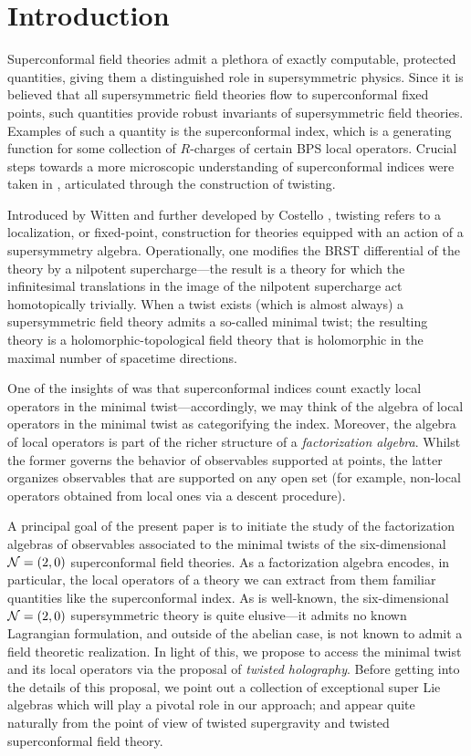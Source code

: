 \documentclass[11pt]{amsart}
\begin{document}
\section{Introduction}
Superconformal field theories admit a plethora of exactly computable, protected quantities, giving them a distinguished role in supersymmetric physics. 
Since it is believed that all supersymmetric field theories flow to superconformal fixed points, such quantities provide robust invariants of supersymmetric field theories. 
Examples of such a quantity is the superconformal index, which is a generating function for some collection of $R$-charges of certain BPS local operators. 
Crucial steps towards a more microscopic understanding of superconformal indices were taken in  \cite{}, articulated through the construction of twisting.

Introduced by Witten \cite{WittenTwist} and further developed by Costello \cite{CostelloHol}, twisting refers to a localization, or fixed-point, construction for theories equipped with an action of a supersymmetry algebra. 
Operationally, one modifies the BRST differential of the theory by a nilpotent supercharge---the result is a theory for which the infinitesimal translations in the image of the nilpotent supercharge act homotopically trivially. 
When a twist exists (which is almost always) a supersymmetric field theory admits a so-called minimal twist; the resulting theory is a holomorphic-topological field theory that is holomorphic in the maximal number of spacetime directions.

One of the insights of  \cite{} was that superconformal indices count exactly local operators in the minimal twist---accordingly, we may think of the algebra of local operators in the minimal twist as categorifying the index. 
Moreover, the algebra of local operators is part of the richer structure of a \textit{factorization algebra}. 
Whilst the former governs the behavior of observables supported at points, the latter organizes observables that are supported on any open set (for example, non-local operators obtained from local ones via a descent procedure). 

A principal goal of the present paper is to initiate the study of the factorization algebras of observables associated to the minimal twists of the six-dimensional~$\mathcal N=(2,0)$ superconformal field theories.
As a factorization algebra encodes, in particular, the local operators of a theory we can extract from them familiar quantities like the superconformal index.
As is well-known, the six-dimensional~$\mathcal N=(2,0)$ supersymmetric theory is quite elusive---it admits no known Lagrangian formulation, and outside of the abelian case, is not known to admit a field theoretic realization. 
In light of this, we propose to access the minimal twist and its local operators via the proposal of \textit{twisted holography}.
Before getting into the details of this proposal, we point out a collection of exceptional super Lie algebras which will play a pivotal role in our approach; and appear quite naturally from the point of view of twisted supergravity and twisted superconformal field theory.
\end{document}
